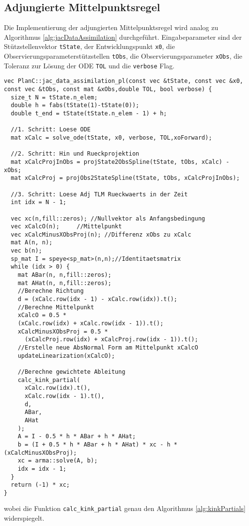\subsection{Adjungierte Mittelpunktsregel}
Die Implementierung der adjungierten Mittelpunktsregel wird analog zu Algorithmus \ref{alg:jacDataAssimilation} durchgeführt. Eingabeparameter sind der Stützstellenvektor \texttt{tState}, der Entwicklungspunkt \texttt{x0}, die Observierungsparameterstützstellen \texttt{tObs}, die Observierungsparameter \texttt{xObs}, die Toleranz zur Lösung der ODE \texttt{TOL} und die \texttt{verbose} Flag.
\begin{lstlisting}[caption=Berechnung der adjungierten Mittelpunktsregel, label=lst:adjMidpointRule]
vec PlanC::jac_data_assimilation_pl(const vec &tState, const vec &x0, const vec &tObs, const mat &xObs,double TOL, bool verbose) {
  size_t N = tState.n_elem;
  double h = fabs(tState(1)-tState(0));
  double t_end = tState(tState.n_elem - 1) + h;

  //1. Schritt: Loese ODE
  mat xCalc = solve_ode(tState, x0, verbose, TOL,xoForward);
  
  //2. Schritt: Hin und Rueckprojektion
  mat xCalcProjInObs = projState2ObsSpline(tState, tObs, xCalc) - xObs;
  mat xCalcProj = projObs2StateSpline(tState, tObs, xCalcProjInObs);
  
  //3. Schritt: Loese Adj TLM Rueckwaerts in der Zeit
  int idx = N - 1;
  
  vec xc(n,fill::zeros); //Nullvektor als Anfangsbedingung
  vec xCalcO(n);	 //Mittelpunkt
  vec xCalcMinusXObsProj(n); //Differenz xObs zu xCalc 
  mat A(n, n);
  vec b(n);
  sp_mat I = speye<sp_mat>(n,n);//Identitaetsmatrix
  while (idx > 0) {
    mat ABar(n, n,fill::zeros);
    mat AHat(n, n,fill::zeros);
    //Berechne Richtung
    d = (xCalc.row(idx - 1) - xCalc.row(idx)).t();
    //Berechne Mittelpunkt
    xCalcO = 0.5 * 
	(xCalc.row(idx) + xCalc.row(idx - 1)).t();
    xCalcMinusXObsProj = 0.5 * 
	  (xCalcProj.row(idx) + xCalcProj.row(idx - 1)).t();
    //Erstelle neue AbsNormal Form am Mittelpunkt xCalcO
    updateLinearization(xCalcO);
    
    //Berechne gewichtete Ableitung
    calc_kink_partial(
	  xCalc.row(idx).t(), 
	  xCalc.row(idx - 1).t(),
	  d,
	  ABar,
	  AHat
    );
    A = I - 0.5 * h * ABar + h * AHat;
    b = (I + 0.5 * h * ABar + h * AHat) * xc - h * (xCalcMinusXObsProj);
    xc = arma::solve(A, b);
    idx = idx - 1;
  }
  return (-1) * xc;
}
\end{lstlisting}
wobei die Funktion \texttt{calc\_kink\_partial} genau den Algorithmus \ref{alg:kinkPartials} widerspiegelt.
